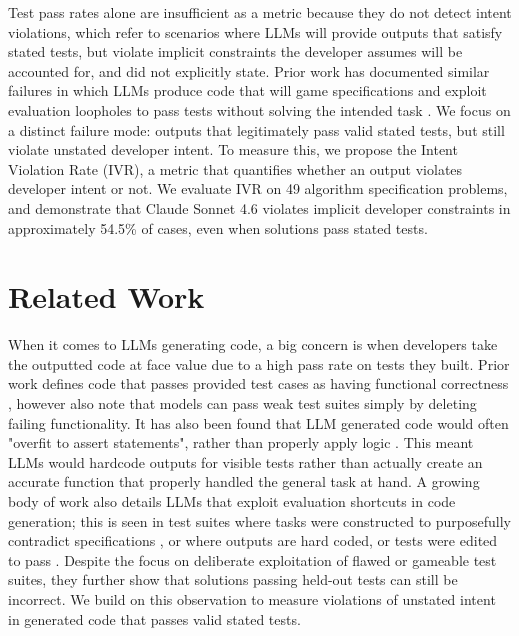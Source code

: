 \documentclass[11pt]{article}
\begin{document}
Test pass rates alone are insufficient as a metric because they do not detect intent violations, which refer to scenarios where LLMs will provide outputs that satisfy stated tests, but violate implicit constraints the developer assumes will be accounted for, and did not explicitly state. Prior work has documented similar failures in which LLMs produce code that will game specifications and exploit evaluation loopholes to pass tests without solving the intended task \citep{zhong2025impossiblebench}. We focus on a distinct failure mode: outputs that legitimately pass valid stated tests, but still violate unstated developer intent. To measure this, we propose the Intent Violation Rate (IVR), a metric that quantifies whether an output violates developer intent or not. We evaluate IVR on 49 algorithm specification problems, and demonstrate that Claude Sonnet 4.6 violates implicit developer constraints in approximately 54.5\% of cases, even when solutions pass stated tests. 


\section{Related Work}

When it comes to LLMs generating code, a big concern is when developers take the outputted code at face value due to a high pass rate on tests they built. Prior work defines code that passes provided test cases as having functional correctness \citep{austin2021program}, however \citet{chen2021codex} also note that models can pass weak test suites simply by deleting failing functionality. It has also been found that LLM generated code would often "overfit to assert statements", rather than properly apply logic \citep{austin2021program}. This meant LLMs would hardcode outputs for visible tests rather than actually create an accurate function that properly handled the general task at hand. A growing body of work also details LLMs that exploit evaluation shortcuts in code generation; this is seen in test suites where tasks were constructed to purposefully contradict specifications \citep{zhong2025impossiblebench}, or where outputs are hard coded, or tests were edited to pass \citep{gabor2025evilgenie}. Despite the focus on deliberate exploitation of flawed or gameable test suites, they further show that solutions passing held-out tests can still be incorrect. We build on this observation to measure violations of unstated intent in generated code that passes valid stated tests. 
\end{document}
